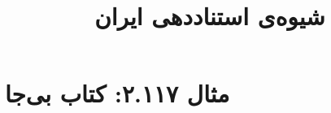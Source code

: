 \documentclass[a4paper,10pt]{article}
\begin{document}
\title{شیوه‌ی استناددهی ایران
 }
\author{}
\date{}
\maketitle



\section*{مثال ۲.۱۱۷: کتاب بی‌جا}

\cite{دبیری1373}\\
\cite{wilson1992}\\






\end{document}
